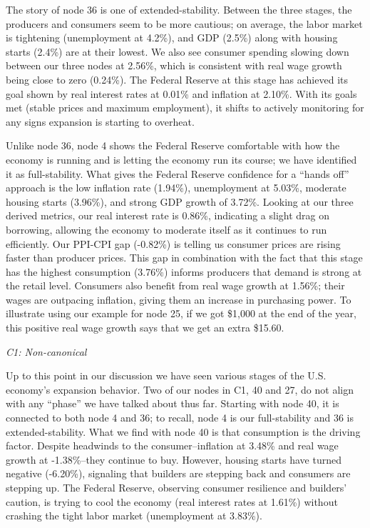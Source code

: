 \documentclass[10pt, letterpaper]{article}
\begin{document}
The story of node 36 is one of extended-stability. Between the three
stages, the producers and consumers seem to be more cautious; on
average, the labor market is tightening (unemployment at 4.2\%), and GDP
(2.5\%) along with housing starts (2.4\%) are at their lowest. We also
see consumer spending slowing down between our three nodes at 2.56\%,
which is consistent with real wage growth being close to zero (0.24\%).
The Federal Reserve at this stage has achieved its goal shown by real
interest rates at 0.01\% and inflation at 2.10\%. With its goals met
(stable prices and maximum employment), it shifts to actively monitoring
for any signs expansion is starting to overheat.

Unlike node 36, node 4 shows the Federal Reserve comfortable with how
the economy is running and is letting the economy run its course; we
have identified it as full-stability. What gives the Federal Reserve
confidence for a ``hands off'' approach is the low inflation rate
(1.94\%), unemployment at 5.03\%, moderate housing starts (3.96\%), and
strong GDP growth of 3.72\%. Looking at our three derived metrics, our
real interest rate is 0.86\%, indicating a slight drag on borrowing,
allowing the economy to moderate itself as it continues to run
efficiently. Our PPI-CPI gap (-0.82\%) is telling us consumer prices are
rising faster than producer prices. This gap in combination with the
fact that this stage has the highest consumption (3.76\%) informs
producers that demand is strong at the retail level. Consumers also
benefit from real wage growth at 1.56\%; their wages are outpacing
inflation, giving them an increase in purchasing power. To illustrate
using our example for node 25, if we got \$1,000 at the end of the year,
this positive real wage growth says that we get an extra \$15.60.

\emph{C1: Non-canonical}

Up to this point in our discussion we have seen various stages of the
U.S. economy's expansion behavior. Two of our nodes in C1, 40 and 27, do
not align with any ``phase'' we have talked about thus far. Starting
with node 40, it is connected to both node 4 and 36; to recall, node 4
is our full-stability and 36 is extended-stability. What we find with
node 40 is that consumption is the driving factor. Despite headwinds to
the consumer--inflation at 3.48\% and real wage growth at -1.38\%--they
continue to buy. However, housing starts have turned negative (-6.20\%),
signaling that builders are stepping back and consumers are stepping up.
The Federal Reserve, observing consumer resilience and builders'
caution, is trying to cool the economy (real interest rates at 1.61\%)
without crashing the tight labor market (unemployment at 3.83\%).
\end{document}
